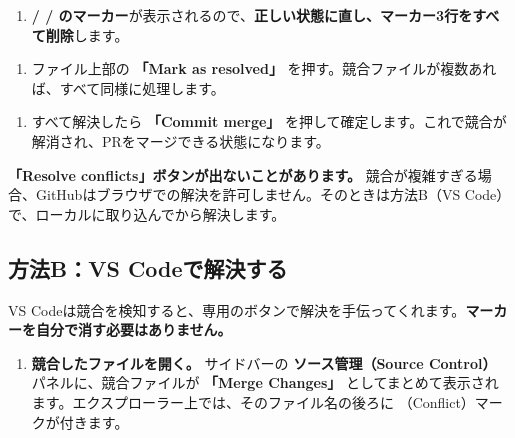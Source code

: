 \begin{enumerate}[leftmargin=1.6em, start=2]
  \item \textbf{\cmd{<<<<<<<} / \cmd{=======} / \cmd{>>>>>>>} のマーカー}が表示されるので、\textbf{正しい状態に直し、マーカー3行をすべて削除}します。
\end{enumerate}

\begin{enumerate}[leftmargin=1.6em, start=3]
  \item ファイル上部の \textbf{「Mark as resolved」} を押す。競合ファイルが複数あれば、すべて同様に処理します。
\end{enumerate}

\begin{enumerate}[leftmargin=1.6em, start=4]
  \item すべて解決したら \textbf{「Commit merge」} を押して確定します。これで競合が解消され、PRをマージできる状態になります。
\end{enumerate}

\begin{warnbox}
\textbf{「Resolve conflicts」ボタンが出ないことがあります。} 競合が複雑すぎる場合、GitHubはブラウザでの解決を許可しません。そのときは方法B（VS Code）で、ローカルに取り込んでから解決します。
\end{warnbox}

\subsection{方法B：VS Codeで解決する}

VS Codeは競合を検知すると、専用のボタンで解決を手伝ってくれます。\textbf{マーカーを自分で消す必要はありません。}

\begin{enumerate}[leftmargin=1.6em]
  \item \textbf{競合したファイルを開く。} サイドバーの \textbf{ソース管理（Source Control）} パネルに、競合ファイルが \textbf{「Merge Changes」} としてまとめて表示されます。エクスプローラー上では、そのファイル名の後ろに \cmd{!}（Conflict）マークが付きます。
\end{enumerate}

